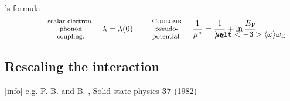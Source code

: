 \documentclass[10pt]{beamer}
\begin{document}
\begin{frame}[label=McMillan]{'s formula}
        \begingroup
            \color{titleblue}
            \hrulefill \vspace{-2mm}
            \begin{equation*}
                \begin{minipage}[c]{2cm}
                    \centering \footnotesize
                    scalar electron- \\
                    phonon coupling:
                \end{minipage}
                \quad
                \lambda = \lambda(0)
                \qquad
                \begin{minipage}[c]{15mm}
                    \centering \footnotesize
                    \name{Coulomb} \\
                    pseudo- \\
                    potential:
                \end{minipage}
                \quad
                \frac 1 {\mu^*} = \frac 1 {\mu \sub C} + \ln \frac
                    {E \sub F}
                    {\mathclap{\smash[b]{\alt<-3>{\av \omega}{\omega \sub E}}}}
            \end{equation*}
        \endgroup
        \vspace{-3mm}
    \end{frame}

    \subsection[\name{Coulomb} potential]
        {Rescaling the  interaction}

    [info]{%
        e.g. P. B.  and B. ,
        Solid state physics \textbf{37} (1982)}

    \newsavebox\RDOS

    \savebox\RDOS{\small}
    \savebox\CDOS{\small}

    \newsavebox\convergence
    \newsavebox\convergenceCDOS

    \savebox\convergence    {\small}
    \savebox\convergenceCDOS{\small}
\end{document}
